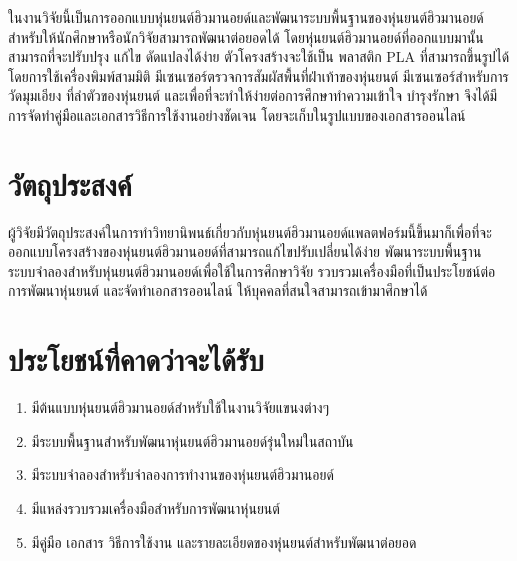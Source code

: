 ในงานวิจัยนี้เป็นการออกแบบหุ่นยนต์ฮิวมานอยด์และพัฒนาระบบพื้นฐานของหุ่นยนต์ฮิวมานอยด์
สำหรับให้นักศึกษาหรือนักวิจัยสามารถพัฒนาต่อยอดได้ โดยหุ่นยนต์ฮิวมานอยด์ที่ออกแบบมานั้น 
สามารถที่จะปรับปรุง แก้ไข ดัดแปลงได้ง่าย ตัวโครงสร้างจะใช้เป็น พลาสติก PLA ที่สามารถขึ้นรูปได้
โดยการใช้เครื่องพิมพ์สามมิติ มีเซนเซอร์ตรวจการสัมผัสพื้นที่ฝ่าเท้าของหุ่นยนต์ มีเซนเซอร์สำหรับการวัดมุมเอียง
ที่ลำตัวของหุ่นยนต์ และเพื่อที่จะทำให้ง่ายต่อการศึกษาทำความเข้าใจ บำรุงรักษา 
จึงได้มีการจัดทำคู่มือและเอกสารวิธีการใช้งานอย่างชัดเจน โดยจะเก็บในรูปแบบของเอกสารออนไลน์


\clearpage
\section{วัตถุประสงค์}
ผู้วิจัยมีวัตถุประสงค์ในการทำวิทยานิพนธ์เกี่ยวกับหุ่นยนต์ฮิวมานอยด์แพลตฟอร์มนี้ขึ้นมาก็เพื่อที่จะ
ออกแบบโครงสร้างของหุ่นยนต์ฮิวมานอยด์ที่สามารถแก้ไขปรับเปลี่ยนได้ง่าย พัฒนาระบบพื้นฐาน
ระบบจำลองสำหรับหุ่นยนต์ฮิวมานอยด์เพื่อใช้ในการศึกษาวิจัย รวบรวมเครื่องมือที่เป็นประโยชน์ต่อการพัฒนาหุ่นยนต์
และจัดทำเอกสารออนไลน์ ให้บุคคลที่สนใจสามารถเข้ามาศึกษาได้

\section{ประโยชน์ที่คาดว่าจะได้รับ}
\begin{enumerate}[label=\thesection.\arabic*, leftmargin=1.5cm]
	\setlength\itemsep{-0.25em}
	\item มีต้นแบบหุ่นยนต์ฮิวมานอยด์สำหรับใช้ในงานวิจัยแขนงต่างๆ
	\item มีระบบพื้นฐานสำหรับพัฒนาหุ่นยนต์ฮิวมานอยด์รุ่นใหม่ในสถาบัน
	\item มีระบบจำลองสำหรับจำลองการทำงานของหุ่นยนต์ฮิวมานอยด์
	\item มีแหล่งรวบรวมเครื่องมือสำหรับการพัฒนาหุ่นยนต์
	\item มีคู่มือ เอกสาร วิธีการใช้งาน และรายละเอียดของหุ่นยนต์สำหรับพัฒนาต่อยอด
\end{enumerate}

